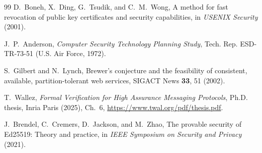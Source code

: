\documentclass[aps,prx,reprint,superscriptaddress,nofootinbib,floatfix]{revtex4-2}
\theoremstyle{remark}
\begin{document}
\begin{thebibliography}{99}
 D.~Boneh, X.~Ding, G.~Tsudik, and C.~M.~Wong, A method for fast revocation of public key certificates and security capabilities, in \emph{USENIX Security} (2001).

 J.~P.~Anderson, \emph{Computer Security Technology Planning Study}, Tech. Rep. ESD-TR-73-51 (U.S. Air Force, 1972).

 S.~Gilbert and N.~Lynch, Brewer's conjecture and the feasibility of consistent, available, partition-tolerant web services, SIGACT News \textbf{33}, 51 (2002).

 T.~Wallez, \emph{Formal Verification for High Assurance Messaging Protocols}, Ph.D. thesis, Inria Paris (2025), Ch.~6, \url{https://www.twal.org/pdf/thesis.pdf}.

 J.~Brendel, C.~Cremers, D.~Jackson, and M.~Zhao, The provable security of Ed25519: Theory and practice, in \emph{IEEE Symposium on Security and Privacy} (2021).

\end{thebibliography}
\end{document}
